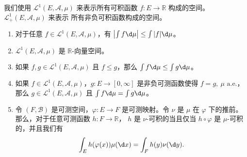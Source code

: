 \documentclass[fontset=none]{Notes}
\newcommand{\alev}[1]{\text{$#1$ a.e.}}
\begin{document}
我们使用 $\mathcal{L}^1(E,\mathcal{A},\mu)$ 来表示所有可积函数
$f:E\to \mathbb{R}$ 构成的空间。$\mathcal{L}_+^1(E,\mathcal{A},\mu)$ 来表示
所有非负可积函数构成的空间。

\begin{proposition}[可积函数的性质]
  \mbox{}
  \begin{enumerate}
    \item 对于任意 $f\in \mathcal{L}^1(E,\mathcal{A},\mu)$，有
    $\bigl|\int f\d\mu\bigr|\leq \int |f|\d\mu$。
    \item $\mathcal{L}^1(E,\mathcal{A},\mu)$ 是 $\mathbb{R}$-向量空间。
    \item 如果 $f,g\in \mathcal{L}^1(E,\mathcal{A},\mu)$ 且
    $f\leq g$，那么 $\int f\d\mu\leq \int g\d\mu$。
    \item 如果 $f\in \mathcal{L}^1(E,\mathcal{A},\mu)$，$g:E\to [0,\infty]$
    是非负可测函数使得 $f=g,\ \alev{\mu}$，那么
    $g\in \mathcal{L}^1(E,\mathcal{A},\mu)$ 且 $\int f\d\mu=\int g\d\mu$。
    \item 令 $(F,\mathcal{B})$ 是可测空间，$\varphi:E\to F$ 是可测映射。令
    $\nu$ 是 $\mu$ 在 $\varphi$ 下的推前。那么，对于任意可测函数 $h:F\to \mathbb{R}$，
    $h$ 是 $\nu$-可积的当且仅当 $h\circ\varphi$ 是 $\mu$-可积的，并且我们有
    \[
      \int_Eh(\varphi(x))\mu(\d x)=\int_Fh(y)\nu(\d y).
    \]
  \end{enumerate}
\end{proposition}
\end{document}
